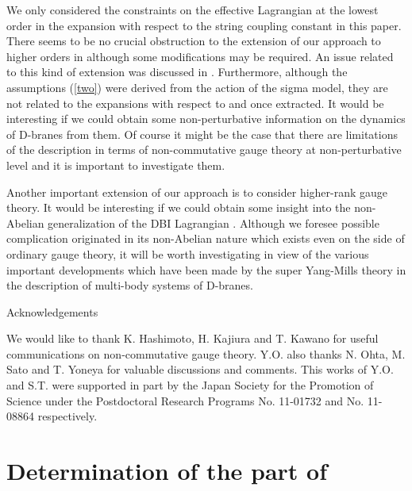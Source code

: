 \documentclass[a4paper,12pt]{article}
\begin{document}
We only considered the constraints on the effective Lagrangian
at the lowest order in the expansion
with respect to the string coupling constant \coordHE{}
in this paper.
There seems to be no crucial obstruction
to the extension of our approach to higher orders in \coordHE{}
although some modifications may be required.
An issue related to this kind of extension was discussed
in \cite{Andreev}.
Furthermore, although the assumptions (\ref{two}) were
derived from the action of the sigma model,
they are not related to the expansions with respect to
\coordHE{} and \coordHE{} once extracted.
It would be interesting
if we could obtain some non-perturbative information
on the dynamics of D-branes from them.
Of course it might be the case that
there are limitations of the description
in terms of non-commutative gauge theory
at non-perturbative level
and it is important to investigate them.

Another important extension of our approach
is to consider higher-rank gauge theory.
It would be interesting if we could obtain
some insight into the non-Abelian generalization
of the DBI Lagrangian \cite{NDBI}.
Although we foresee possible complication
originated in its non-Abelian nature
which exists even on the side of ordinary gauge theory,
it will be worth investigating
in view of the various important developments which have been made
by the super Yang-Mills theory
in the description of multi-body systems of D-branes.

\vspace{0.4cm}
\noindent
Acknowledgements

We would like to thank K. Hashimoto, H. Kajiura and T. Kawano
for useful communications on non-commutative gauge theory.
Y.O. also thanks N. Ohta, M. Sato and T. Yoneya
for valuable discussions and comments. 
This works of Y.O. and S.T. were supported in part
by the Japan Society for the Promotion of Science
under the Postdoctoral Research Programs No. 11-01732
and No. 11-08864 respectively.

\newpage
\appendix
\renewcommand{\thesection}{Appendix \Alph{section}.}
\renewcommand{\theequation}{\Alph{section}.\arabic{equation}}

\section{Determination of the \coordHE{} part of \coordHE{}}
\setcounter{equation}{0}
\indent
\end{document}
